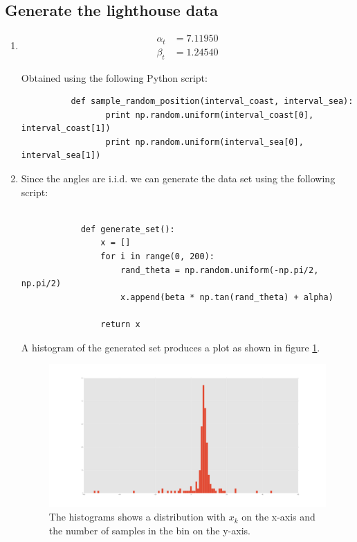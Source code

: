 \documentclass[paper=a4, fontsize=10pt]{scrartcl} %
\numberwithin{equation}{section} %
\numberwithin{figure}{section} %
\numberwithin{table}{section} %
\begin{document}
\subsection{Generate the lighthouse data}
\begin{enumerate}
	\item \begin{align}
			\alpha_t &= 7.11950 \\
			\beta_t &= 1.24540
		  \end{align}

		  Obtained using the following Python script:

		  \begin{verbatim}
		  def sample_random_position(interval_coast, interval_sea):
			     print np.random.uniform(interval_coast[0], interval_coast[1])
			     print np.random.uniform(interval_sea[0], interval_sea[1])
		  \end{verbatim}

	\item
			Since the angles are i.i.d. we can generate the data set using the following script:

			\begin{verbatim}

			def generate_set():
			    x = []
			    for i in range(0, 200):
			        rand_theta = np.random.uniform(-np.pi/2, np.pi/2)
			        x.append(beta * np.tan(rand_theta) + alpha)

			    return x
			\end{verbatim}

			A histogram of the generated set produces a plot as shown in figure \ref{histo}.

			\begin{figure}[H]
				\centering
				\includegraphics[width=\textwidth]{histogram.png}
				\caption{The histograms shows a distribution with $x_k$ on the x-axis and the number of samples in the bin on the y-axis.}
				\label{histo}
			\end{figure}


\end{enumerate}
\end{document}
